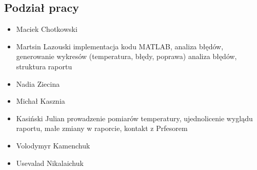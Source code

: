 \documentclass[a4paper,12pt]{article}
\begin{document}
\subsection{Podział pracy}

\begin{itemize}
    \item Maciek Chotkowski
    \item Martsin Lazouski  implementacja kodu MATLAB, analiza błędów, generowanie wykresów (temperatura, błędy, poprawa)
    analiza błędów, struktura raportu
    \item  Nadia Ziecina
    \item  Michał Kasznia
    \item Kasiński Julian  prowadzenie pomiarów temperatury, ujednolicenie wyglądu raportu, małe zmiany w raporcie, kontakt z Prfesorem
    \item Volodymyr Kamenchuk
    \item Usevalad Nikalaichuk 
\end{itemize}
\end{document}
